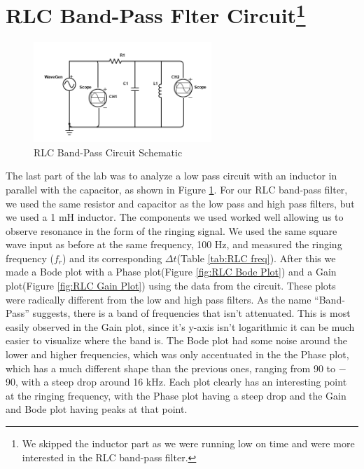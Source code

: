 \documentclass{article}
\begin{document}
\section[RLC]{RLC Band-Pass Flter Circuit\footnote{We skipped the inductor part as we were running low on time and were more interested in the RLC band-pass filter.}}
\begin{figure}\vspace{-5mm}
    \centering
    \includegraphics[width=0.6\textwidth]{Images/Scheme-it-export-PHYS-605-L3A2-RLC-Band-Pass-2024-03-03-23-39.png}
    \caption{RLC Band-Pass Circuit Schematic}
    \label{fig:RLC Circuit}
\end{figure}
The last part of the lab was to analyze a low pass circuit with an inductor in parallel with the capacitor, as shown in Figure \ref{fig:RLC Circuit}. For our RLC band-pass filter, we used the same resistor and capacitor as the low pass and high pass filters, but we used a 1 mH inductor. The components we used worked well allowing us to observe resonance in the form of the ringing signal. We used the same square wave input as before at the same frequency, 100 Hz, and measured the ringing frequency ($f_r$) and its corresponding $\Delta t$(Table \ref{tab:RLC freq}). After this we made a Bode plot with a Phase plot(Figure \ref{fig:RLC Bode Plot}) and a Gain plot(Figure \ref{fig:RLC Gain Plot}) using the data from the circuit. These plots were radically different from the low and high pass filters. As the name ``Band-Pass'' suggests, there is a band of frequencies that isn't attenuated. This is most easily observed in the Gain plot, since it's y-axis isn't logarithmic it can be much easier to visualize where the band is. The Bode plot had some noise around the lower and higher frequencies, which was only accentuated in the the Phase plot, which has a much different shape than the previous ones, ranging from 90 to $-$90, with a steep drop around 16 kHz. Each plot clearly has an interesting point at the ringing frequency, with the Phase plot having a steep drop and the Gain and Bode plot having peaks at that point.
\end{document}

